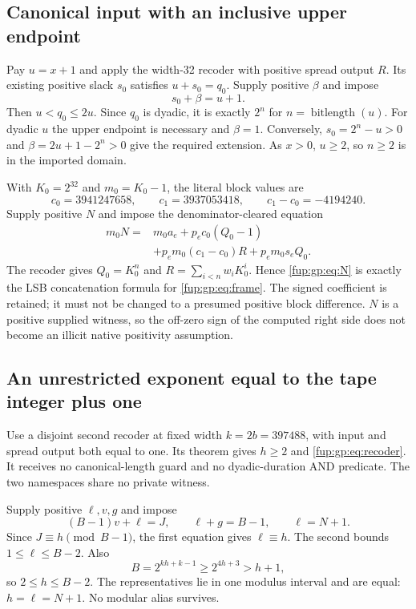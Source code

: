 \documentclass[11pt,letterpaper]{article}
\theoremstyle{definition}\newtheorem{definition}[theorem]{Definition}
\theoremstyle{remark}\newtheorem{remark}[theorem]{Remark}
\newcommand{\bits}{\operatorname{bitlength}}
\begin{document}
\subsection{Canonical input with an inclusive upper endpoint}
Pay $u=x+1$ and apply the width-32 recoder with positive spread output $R$. Its existing positive slack $s_0$ satisfies $u+s_0=q_0$. Supply positive $\beta$ and impose
\[
 s_0+\beta=u+1.
\]
Then $u<q_0\le2u$. Since $q_0$ is dyadic, it is exactly $2^n$ for $n=\bits(u)$. For dyadic $u$ the upper endpoint is necessary and $\beta=1$. Conversely, $s_0=2^n-u>0$ and $\beta=2u+1-2^n>0$ give the required extension. As $x>0$, $u\ge2$, so $n\ge2$ is in the imported domain.

With $K_0=2^{32}$ and $m_0=K_0-1$, the literal block values are
\[
 c_0=3941247658,\qquad c_1=3937053418,\qquad c_1-c_0=-4194240.
\]
Supply positive $N$ and impose the denominator-cleared equation
\begin{align}\label{fup:gp:eq:N}
 m_0N={}&m_0a_e+p_ec_0(Q_0-1)\\
       &+p_em_0(c_1-c_0)R+p_em_0s_eQ_0.\nonumber
\end{align}
The recoder gives $Q_0=K_0^n$ and $R=\sum_{i<n}w_iK_0^i$. Hence \eqref{fup:gp:eq:N} is exactly the LSB concatenation formula for \eqref{fup:gp:eq:frame}. The signed coefficient is retained; it must not be changed to a presumed positive block difference. $N$ is a positive supplied witness, so the off-zero sign of the computed right side does not become an illicit native positivity assumption.

\subsection{An unrestricted exponent equal to the tape integer plus one}
Use a disjoint second recoder at fixed width $k=2b=397488$, with input and spread output both equal to one. Its theorem gives $h\ge2$ and \eqref{fup:gp:eq:recoder}. It receives no canonical-length guard and no dyadic-duration AND predicate. The two namespaces share no private witness.

Supply positive $\ell,v,g$ and impose
\begin{equation}\label{fup:gp:eq:extract}
 (B-1)v+\ell=J,\qquad \ell+g=B-1,\qquad \ell=N+1.
\end{equation}
Since $J\equiv h\pmod{B-1}$, the first equation gives $\ell\equiv h$. The second bounds $1\le\ell\le B-2$. Also
\[
 B=2^{kh+k-1}\ge2^{4h+3}>h+1,
\]
so $2\le h\le B-2$. The representatives lie in one modulus interval and are equal: $h=\ell=N+1$. No modular alias survives.
\end{document}
